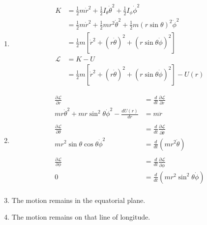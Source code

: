 \documentclass{article}
\begin{document}
\begin{enumerate}
  \item

        \begin{align*}
          K           & = \frac{1}{2} m \dot{r}^2 + \frac{1}{2} I_\theta \dot{\theta}^2 + \frac{1}{2} I_\phi \dot{\phi}^2           \\
                      & = \frac{1}{2} m \dot{r}^2 + \frac{1}{2} m r^2 \dot{\theta}^2 + \frac{1}{2} m (r \sin \theta)^2 \dot{\phi}^2 \\
                      & = \frac{1}{2} m [\dot{r}^2 + (r \dot{\theta})^2 + (r \sin \theta \dot{\phi})^2]                             \\
          \mathcal{L} & = K - U                                                                                                     \\
                      & = \frac{1}{2} m [\dot{r}^2 + (r \dot{\theta})^2 + (r \sin \theta \dot{\phi})^2] - U(r)
        \end{align*}

  \item

        \begin{align*}
          \frac{\partial \mathcal{L}}{\partial r}                                  & = \frac{d}{d t} \frac{\partial \mathcal{L}}{\partial \dot{r}}      \\
          m r \dot{\theta}^2 + m r \sin^2 \theta \dot{\phi}^2 - \frac{d U(r)}{d r} & = m \ddot{r}                                                       \\ \\
          \frac{\partial \mathcal{L}}{\partial \theta}                             & = \frac{d}{d t} \frac{\partial \mathcal{L}}{\partial \dot{\theta}} \\
          m r^2 \sin \theta \cos \theta \dot{\phi}^2                               & = \frac{d}{d t} (m r^2 \dot{\theta})                               \\ \\
          \frac{\partial \mathcal{L}}{\partial \phi}                               & = \frac{d}{d t} \frac{\partial \mathcal{L}}{\partial \dot{\phi}}   \\
          0                                                                        & = \frac{d}{d t} (m r^2 \sin^2 \theta \dot{\phi})                   \\
        \end{align*}

  \item The motion remains in the equatorial plane.

  \item The motion remains on that line of longitude.
\end{enumerate}
\end{document}
